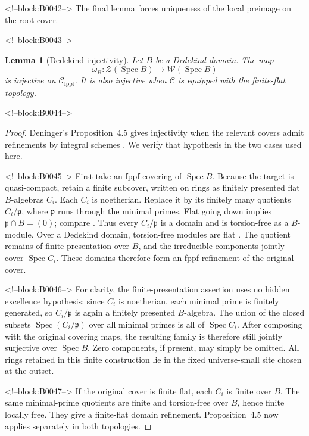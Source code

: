 \documentclass[11pt]{article}
\newtheorem{lemma}[theorem]{Lemma}
\theoremstyle{definition}
\newcommand{\Spec}{\operatorname{Spec}}
\newcommand{\Zsh}{\mathcal Z}
\newcommand{\Wsh}{\mathcal W}
\newcommand{\fppf}{\mathrm{fppf}}
\begin{document}
<!--block:B0042-->
The final lemma forces uniqueness of the local preimage on the root cover.

<!--block:B0043-->
\begin{lemma}[Dedekind injectivity]\label{lem:dedekind}
Let \(B\) be a Dedekind domain.  The map
\[
 \omega_B\colon\Zsh(\Spec B)\longrightarrow\Wsh(\Spec B)
\]
is injective on \(\mathscr C_{\fppf}\).  It is also injective when
\(\mathscr C\) is equipped with the finite-flat topology.
\end{lemma}

<!--block:B0044-->
\begin{proof}
Deninger's Proposition~4.5 gives injectivity when the relevant covers admit
refinements by integral schemes
\cite[Prop.~4.5, pp.~22--23]{Deninger2025Rational}.  We verify that
hypothesis in the two cases used here.

<!--block:B0045-->
First take an fppf covering of \(\Spec B\).  Because the target is
quasi-compact, retain a finite subcover, written on rings as finitely
presented flat \(B\)-algebras \(C_i\).  Each \(C_i\) is noetherian.
Replace it by its finitely many quotients \(C_i/\mathfrak p\), where
\(\mathfrak p\) runs through the minimal primes.  Flat going down implies
\(\mathfrak p\cap B=(0)\); compare
\cite[Tag 00HS]{StacksProject}.  Thus every \(C_i/\mathfrak p\) is a
domain and is torsion-free as a \(B\)-module.  Over a Dedekind domain,
torsion-free modules are flat
\cite[Tag 0AUW]{StacksProject}.  The quotient remains of finite
presentation over \(B\), and the irreducible components jointly cover
\(\Spec C_i\).  These domains therefore form an fppf refinement of the
original cover.

<!--block:B0046-->
For clarity, the finite-presentation assertion uses no hidden excellence
hypothesis: since \(C_i\) is noetherian, each minimal prime is finitely
generated, so \(C_i/\mathfrak p\) is again a finitely presented
\(B\)-algebra.  The union of the closed subsets
\(\Spec(C_i/\mathfrak p)\) over all minimal primes is all of
\(\Spec C_i\).  After composing with the original covering maps, the
resulting family is therefore still jointly surjective over \(\Spec B\).
Zero components, if present, may simply be omitted.
All rings retained in this finite construction lie in the fixed
universe-small site chosen at the outset.

<!--block:B0047-->
If the original cover is finite flat, each \(C_i\) is finite over \(B\).
The same minimal-prime quotients are finite and torsion-free over \(B\),
hence finite locally free.  They give a finite-flat domain refinement.
Proposition~4.5 now applies separately in both topologies.
\end{proof}
\end{document}
